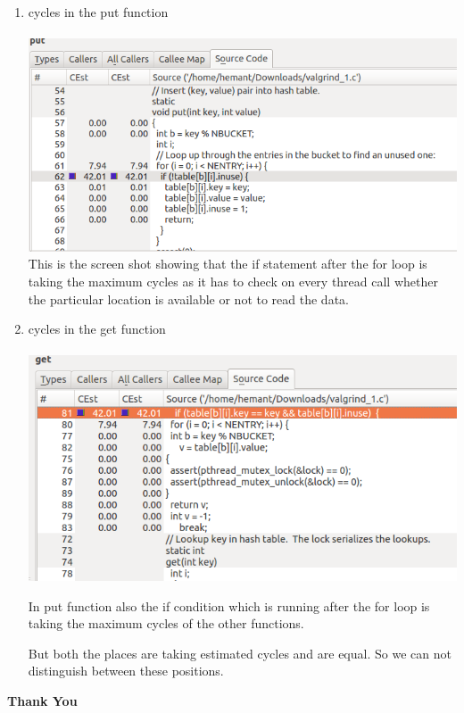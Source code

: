 \documentclass{sem5}
\begin{document}
\begin{itemize}
\begin{enumerate}
\item cycles in the put function\\\\
\includegraphics[scale=0.7]{cycles_in_put.png}\\
This is the screen shot showing that the if statement after the for loop is taking the maximum cycles as it has to check on every thread call whether the particular location is available or not to read the data.
 \newpage
\item cycles in the get function\\\\
\includegraphics[scale=0.7]{cycles_in_get.png}

In put function also the if condition which is running after the for loop is taking the maximum cycles of the other functions.

But both the places are taking estimated cycles and are equal. So we can not distinguish between these positions. 

\end{enumerate}



\end{itemize}
\vspace{4cm}

\begin{center}
\textbf{Thank You}
\end{center}
\end{document}
